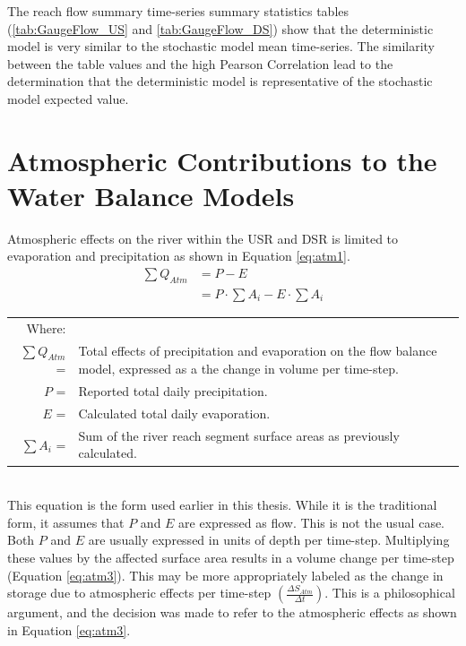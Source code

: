 \begin{linenumbers}
The reach flow summary time-series summary statistics tables (\ref{tab:GaugeFlow_US} and \ref{tab:GaugeFlow_DS}) show that the deterministic model is very similar to the stochastic model mean time-series.  The similarity between the table values and the high Pearson Correlation lead to the determination that the deterministic model is representative of the stochastic model expected value.  


\section{Atmospheric Contributions to the Water Balance Models}
Atmospheric effects on the river within the USR and DSR is limited to evaporation and precipitation as shown in Equation \ref{eq:atm1}.
\begin{align}
	\label{eq:atm1}
	\sum Q_{Atm}&=P-E\\
		\label{eq:atm2}
		& = P \cdot \sum A_i - E \cdot \sum A_i
\end{align}
\begin{tabular}{r p{5in}}
	Where:& \\
	$ \displaystyle \sum Q_{Atm} $ = & Total effects of precipitation and evaporation on the flow balance model, expressed as a the change in volume per time-step.\\ 
	$ P $ = & Reported total daily precipitation.\\
	$ E $ = & Calculated total daily evaporation.\\
	$ \displaystyle \sum A_i  $ = & Sum of the river reach segment surface areas as previously calculated. \\
\end{tabular}\\

This equation is the form used earlier in this thesis.  While it is the traditional form, it assumes that $ P $ and $ E $ are expressed as flow.  This is not the usual case.  Both $ P $ and $ E $ are usually expressed in units of depth per time-step.  Multiplying these values by the affected surface area results in a volume change per time-step (Equation \ref{eq:atm3}).  This may be more appropriately labeled as the change in storage due to atmospheric effects per time-step $ \displaystyle \left( \frac{\Delta S_{Atm}}{\Delta t} \right) $.  This is a philosophical argument, and the decision was made to refer to the atmospheric effects as shown in Equation \ref{eq:atm3}.


\end{linenumbers}
